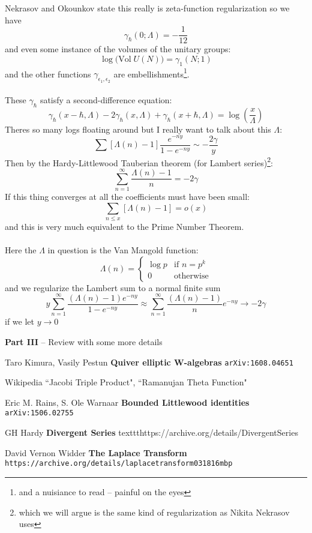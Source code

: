 \documentclass[12pt]{article}
\begin{document}
\noindent Nekrasov and Okounkov state this really is zeta-function regularization so we have
$$ \gamma_{\hbar}(0; \Lambda) = - \frac{1}{12} $$
and even some instance of the volumes of the unitary groups:
$$ \log \big( \text{Vol}\; U(N) \big) = \gamma_1(N; 1)$$ 
and the other functions $\gamma_{\epsilon_1, \epsilon_2}$ are embellishments\footnote{and a nuisiance to read -- painful on the eyes}. \\ \\
These $\gamma_\hbar$ satisfy a second-difference equation:
$$ \gamma_\hbar(x - \hbar, \Lambda  )
- 2\gamma_\hbar(x , \Lambda  )
+ \gamma_\hbar(x + \hbar, \Lambda  )
 = \log \left( \frac{x}{\Lambda} \right)$$
Theres so many logs floating around but I really want to talk about this $\Lambda$:
$$ \sum [\Lambda(n) - 1] \frac{e^{-ny}}{1 - e^{-ny}} \sim - \frac{2\gamma}{y} $$
Then by the Hardy-Littlewood Tauberian theorem (for Lambert series)\footnote{which we will argue is the same kind of regularization as Nikita Nekrasov uses}:
$$ \sum_{n=1}^\infty \frac{\Lambda(n)-1}{n} = - 2\gamma $$
If this thing converges at all the coefficients must have been small:
$$ \sum_{n \leq x} [ \Lambda(n)-1 ] = o(x)$$
and this is very much equivalent to the Prime Number Theorem. \\ \\
Here the $\Lambda$ in question is the Van Mangold function:
$$ \Lambda(n) = \left\{ 
\begin{array}{cl} 
\log p &  \text{if }n = p^k \\
0 & \text{otherwise}
\end{array}
\right. $$
and we regularize the Lambert sum to a normal finite sum
$$ 
y \sum_{n = 1}^\infty \frac{ (\Lambda(n) - 1)e^{-ny}}{1 - e^{-ny}}
\approx 
\sum_{n = 1}^\infty \frac{ (\Lambda(n) - 1)}{n} e^{-ny} \to - 2\gamma
$$
if we let $y \to 0$
\newpage

\noindent \textbf{Part III} -- Review with some more details

\selectfont \fontsize{12}{10}\selectfont

\begin{thebibliography}{}

\item Taro Kimura, Vasily Pestun \textbf{Quiver elliptic W-algebras} \texttt{arXiv:1608.04651}
\item Wikipedia ``Jacobi Triple Product", ``Ramanujan Theta Function"
\item Eric M. Rains, S. Ole Warnaar \textbf{Bounded Littlewood identities} \texttt{arXiv:1506.02755}
\item GH Hardy \textbf{Divergent Series} texttt{https://archive.org/details/DivergentSeries}
\item David Vernon Widder \textbf{The Laplace Transform} \texttt{https://archive.org/details/laplacetransform031816mbp}

\end{thebibliography}
\end{document}
